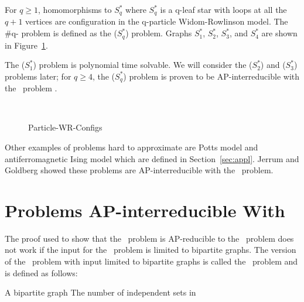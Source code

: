 \begin{example}  \label{exm:particles}
For \(q \ge 1\), homomorphisms to \(S^*_q\) where
\(S^*_q\) is a q-leaf star with loops at all the \(q+1\)
vertices are configuration in the q-particle Widom-Rowlinson model.
The \#q- problem is defined as the \chom(\(S^*_q\)) problem.
Graphs \(S^*_1\), \(S^*_2\), \(S^*_3\), and \(S^*_4\) are shown in Figure~\ref{fig:wrconfigs}.
 
The \chom(\(S^*_1\)) problem is polynomial time solvable.
We will consider the \chom(\(S^*_2\)) and \chom(\(S^*_3\)) problems later;
for \(q \ge 4\), the \chom(\(S^*_q\)) problem is proven to be AP-interreducible
with the \csat\ problem \cite{Leslie03}.
\end{example}

\begin{figure}[h]
\centering 
\subfigure[\(S^*_1\)]{\label{fig:ss1}}\hspace{5cm}
\subfigure[\(S^*_2\)]{\label{fig:ss2}}\\
\subfigure[\(S^*_3\)]{\label{fig:ss3}}\hspace{5cm}
\subfigure[\(S^*_4\)]{\label{fig:ss4}}
\caption{Particle-WR-Configs}
\label{fig:wrconfigs}
\end{figure}

Other examples of problems hard to approximate are Potts model
and antiferromagnetic Ising model which are defined in Section~\ref{sec:appl}. 
Jerrum and Goldberg \cite{Goldberg2007} showed these problems are 
AP-interreducible with the \csat\ problem.

\section{Problems AP-interreducible With \cbis}
The proof used to show that the \csat\ problem is AP-reducible to the \cis\ problem does
not work if the input for the \cis\ problem is limited to bipartite graphs.
The version of the \cis\ problem with input limited to bipartite graphs is called
the \cbis\ problem and is defined as follows:

\pnndef%
{A bipartite graph \mG}
{The number of independent sets in \mG}


